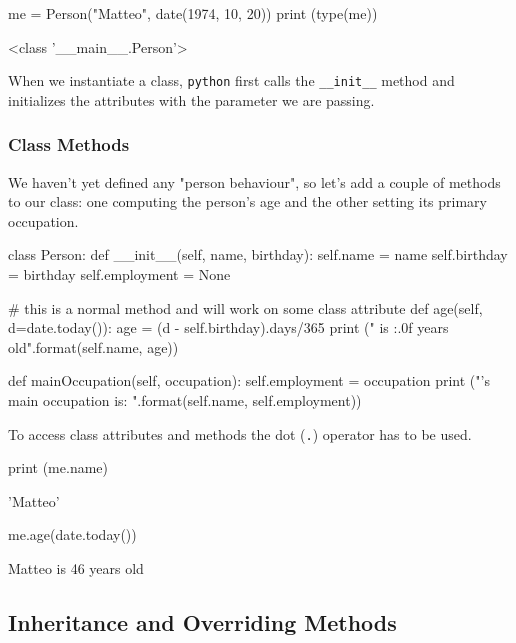 \begin{ipython}
me = Person("Matteo", date(1974, 10, 20))
print (type(me))
\end{ipython}
\begin{ioutput}
<class '\_\_main\_\_.Person'>
\end{ioutput}

When we instantiate a class, \texttt{python} first calls the \texttt{\_\_init\_\_} method and initializes the attributes with the parameter we are passing.

\subsubsection{Class Methods}

We haven't yet defined any "person behaviour", so let's add a couple of methods to our class: one computing the person's age and the other setting its primary occupation.

\begin{ipython}
class Person:
    def __init__(self, name, birthday):
        self.name = name
        self.birthday = birthday
        self.employment = None

    # this is a normal method and will work on some class attribute
    def age(self, d=date.today()):
        age = (d - self.birthday).days/365
        print ("{} is {:.0f} years old".format(self.name, age))

    def mainOccupation(self, occupation):
        self.employment = occupation
        print ("{}'s main occupation is: {}".format(self.name, self.employment))
\end{ipython}

To access class attributes and methods the dot (\texttt{.}) operator has to be used. 

\begin{ipython}
print (me.name)
\end{ipython}
\begin{ioutput}
'Matteo'
\end{ioutput}
        
\begin{ipython}
me.age(date.today())
\end{ipython}
\begin{ioutput}
Matteo is 46 years old
\end{ioutput}

\subsection{Inheritance and Overriding Methods}
\label{inheritance-and-overriding-methods}

